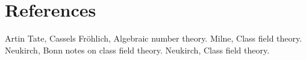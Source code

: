 %







\chapter{References}

\begin{thebibliography}{50}
	Artin Tate,
	Cassels Fr\"ohlich,
	Algebraic number theory.
  Milne,
  Class field theory.
	Neukirch,
	Bonn notes on class field theory.
  Neukirch,
  Class field theory.

\end{thebibliography}
